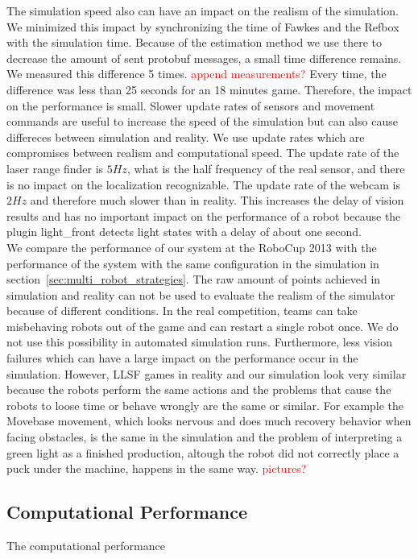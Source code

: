 The simulation speed also can have an impact on the realism of the simulation. We minimized this impact by synchronizing the time of Fawkes and the Refbox with the simulation time. Because of the estimation method we use there to decrease the amount of sent protobuf messages, a small time difference remains. We measured this difference 5 times. \textcolor{red}{append measurements?} Every time, the difference was less than 25 seconds for an 18 minutes game. Therefore, the impact on the performance is small.
Slower update rates of sensors and movement commands are useful to increase the speed of the simulation but can also cause differeces between simulation and reality. We use update rates which are compromises between realism and computational speed. The update rate of the laser range finder is $5 Hz$, what is the half frequency of the real sensor, and there is no impact on the localization recognizable. The update rate of the webcam is $2 Hz$ and therefore much slower than in reality. This increases the delay of vision results and has no important impact on the performance of a robot because the plugin light\_front detects light states with a delay of about one second.\\
We compare the performance of our system at the RoboCup 2013 with the performance of the system with the same configuration in the simulation in section~\ref{sec:multi_robot_strategies}. The raw amount of points achieved in simulation and reality can not be used to evaluate the realism of the simulator because of different conditions. In the real competition, teams can take misbehaving robots out of the game and can restart a single robot once. We do not use this possibility in automated simulation runs. Furthermore, less vision failures which can have a large impact on the performance occur in the simulation. However, LLSF games in reality and our simulation look very similar because the robots perform the same actions and the problems that cause the robots to loose time or behave wrongly are the same or similar. For example the Movebase movement, which looks nervous and does much recovery behavior when facing obstacles, is the same in the simulation and the problem of interpreting a green light as a finished production, altough the robot did not correctly place a puck under the machine, happens in the same way.
\textcolor{red}{pictures?}

\subsection{Computational Performance}
The computational performance 

